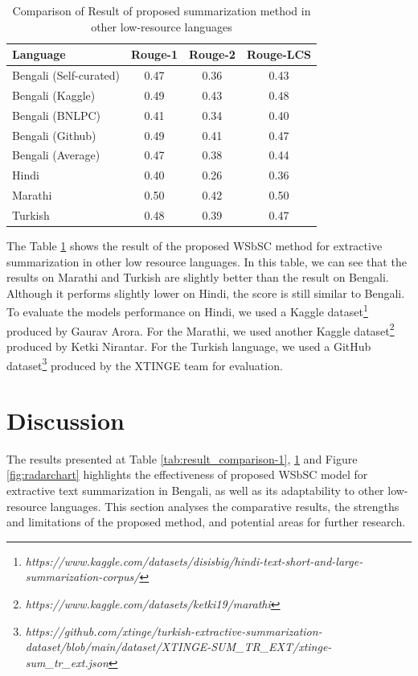 \documentclass[acmlarge]{acmart}
\begin{document}
\begin{table}[]
	\centering
	\begin{tabular}{lccc}\hline
		Language              	& Rouge-1   & Rouge-2   & Rouge-LCS \\\hline
		Bengali (Self-curated)	& 0.47      & 0.36      & 0.43      \\
		Bengali (Kaggle)   		& 0.49      & 0.43      & 0.48      \\
		Bengali (BNLPC)   		& 0.41      & 0.34      & 0.40      \\
		Bengali (Github)   		& 0.49      & 0.41      & 0.47      \\
		Bengali (Average)       & 0.47      & 0.38      & 0.44      \\\hline
		Hindi                   & 0.40      & 0.26      & 0.36      \\\hline
		Marathi                 & 0.50	    & 0.42      & 0.50      \\\hline
		Turkish                 & 0.48      & 0.39      & 0.47      \\\hline
	\end{tabular}
	\caption{Comparison of Result of proposed summarization method in other low-resource languages}
	\label{tab:other_language}
\end{table}

The Table \ref{tab:other_language} shows the result of the proposed WSbSC method for extractive summarization in other low resource languages. In this table, we can see that the results on Marathi and Turkish are slightly better than the result on Bengali. Although it performs slightly lower on Hindi, the score is still similar to Bengali. To evaluate the models performance on Hindi, we used a Kaggle dataset\footnote{\textit{https://www.kaggle.com/datasets/disisbig/hindi-text-short-and-large-summarization-corpus/}} produced by Gaurav Arora. For the Marathi, we used another Kaggle dataset\footnote{\textit{https://www.kaggle.com/datasets/ketki19/marathi}} produced by Ketki Nirantar. For the Turkish language, we used a GitHub dataset\footnote{\textit{https://github.com/xtinge/turkish-extractive-summarization-dataset/blob/main/dataset/XTINGE-SUM\_TR\_EXT/xtinge-sum\_tr\_ext.json}} produced by the XTINGE \cite{Demir-2024-xtinge_turkish_extractive} team for evaluation. 

\section{Discussion}\label{sec:discussion}
The results presented at Table \ref{tab:result_comparison-1}, \ref{tab:other_language} and Figure \ref{fig:radarchart} highlights the effectiveness of proposed WSbSC model for extractive text summarization in Bengali, as well as its adaptability to other low-resource languages. This section analyses the comparative results, the strengths and limitations of the proposed method, and potential areas for further research.\\
\end{document}
